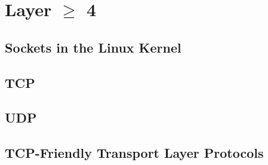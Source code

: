 \section{Layer $\ge$ 4}

\subsection{Sockets in the Linux Kernel}

\subsection{TCP}

\subsection{UDP}

\subsection{TCP-Friendly Transport Layer Protocols}


